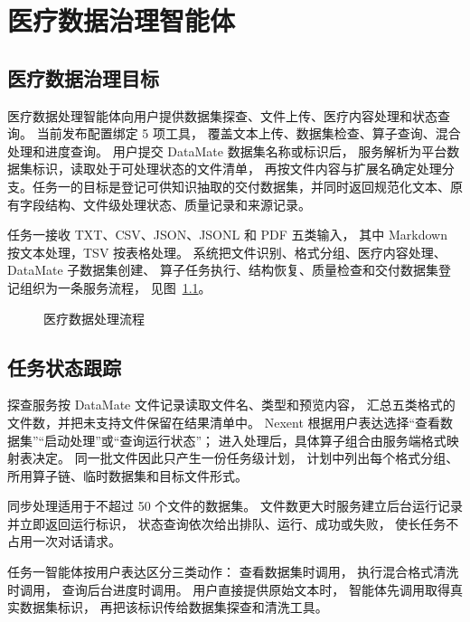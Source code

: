 \chapter{医疗数据治理智能体}

\section{医疗数据治理目标}

医疗数据处理智能体向用户提供数据集探查、文件上传、医疗内容处理和状态查询。
当前发布配置绑定 5 项工具，
覆盖文本上传、数据集检查、算子查询、混合处理和进度查询。
用户提交 DataMate 数据集名称或标识后，
服务解析为平台数据集标识，读取处于可处理状态的文件清单，
再按文件内容与扩展名确定处理分支。任务一的目标是登记可供知识抽取的交付数据集，并同时返回规范化文本、原有字段结构、文件级处理状态、质量记录和来源记录。

任务一接收 TXT、CSV、JSON、JSONL 和 PDF 五类输入，
其中 Markdown 按文本处理，TSV 按表格处理。
系统把文件识别、格式分组、医疗内容处理、DataMate 子数据集创建、
算子任务执行、结构恢复、质量检查和交付数据集登记组织为一条服务流程，
见图~\ref{fig:task1-pipeline}。

\begin{figure}[H]
\centering
\resizebox{0.98\textwidth}{!}{}
\caption{医疗数据处理流程}
\label{fig:task1-pipeline}
\end{figure}

\section{任务状态跟踪}

探查服务按 DataMate 文件记录读取文件名、类型和预览内容，
汇总五类格式的文件数，并把未支持文件保留在结果清单中。
Nexent 根据用户表达选择“查看数据集”“启动处理”或“查询运行状态”；
进入处理后，具体算子组合由服务端格式映射表决定。
同一批文件因此只产生一份任务级计划，
计划中列出每个格式分组、所用算子链、临时数据集和目标文件形式。

同步处理适用于不超过 50 个文件的数据集。
文件数更大时服务建立后台运行记录并立即返回运行标识，
状态查询依次给出排队、运行、成功或失败，
使长任务不占用一次对话请求。

任务一智能体按用户表达区分三类动作：
查看数据集时调用，
执行混合格式清洗时调用，
查询后台进度时调用。
用户直接提供原始文本时，
智能体先调用取得真实数据集标识，
再把该标识传给数据集探查和清洗工具。

